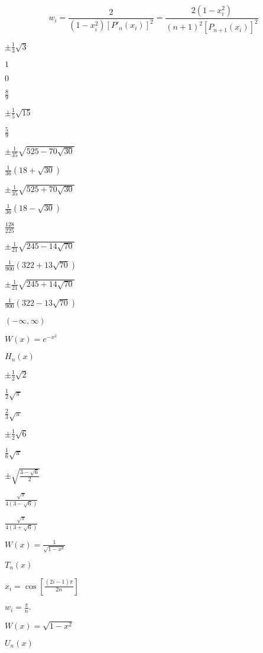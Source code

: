 \documentclass{article}
\begin{document}
\[ w_i = \frac{2}{(1-x_i^2)[P'_n(x_i)]^2}=\frac{2(1-x_i^2)}{(n+1)^2[P_{n+1}(x_i)]^2} \]
\pagebreak

$ \pm \frac{1}{3}\sqrt{3} $
\pagebreak

$ 1 $
\pagebreak

$ 0 $
\pagebreak

$ \frac{8}{9} $
\pagebreak

$ \pm \frac{1}{5} \sqrt{15} $
\pagebreak

$ \frac{5}{9} $
\pagebreak

$ \pm \frac{1}{35}\sqrt{525-70\sqrt{30}} $
\pagebreak

$ \frac{1}{36}(18+\sqrt{30})$
\pagebreak

$ \pm \frac{1}{35}\sqrt{525+70\sqrt{30}} $
\pagebreak

$ \frac{1}{36}(18-\sqrt{30})$
\pagebreak

$ \frac{128}{225}$
\pagebreak

$ \pm \frac{1}{21}\sqrt{245-14\sqrt{70}} $
\pagebreak

$ \frac{1}{900}(322+13\sqrt{70})$
\pagebreak

$ \pm \frac{1}{21}\sqrt{245+14\sqrt{70}} $
\pagebreak

$ \frac{1}{900}(322-13\sqrt{70})$
\pagebreak

$(-\infty,\infty)$
\pagebreak

$ W(x)=e^{-x^2}$
\pagebreak

$ H_n(x)$
\pagebreak

$\pm \frac{1}{2}\sqrt{2} $
\pagebreak

$ \frac{1}{2}\sqrt{\pi} $
\pagebreak

$ \frac{2}{3}\sqrt{\pi} $
\pagebreak

$\pm \frac{1}{2}\sqrt{6} $
\pagebreak

$ \frac{1}{6}\sqrt{\pi} $
\pagebreak

$\pm \sqrt{\frac{3-\sqrt{6}}{2}} $
\pagebreak

$ \frac{\sqrt{\pi}}{4(3-\sqrt{6})} $
\pagebreak

$ \frac{\sqrt{\pi}}{4(3+\sqrt{6})} $
\pagebreak

$ W(x)=\frac{1}{\sqrt{1-x^2}}$
\pagebreak

$ T_n(x) $
\pagebreak

$ x_i=\cos[\frac{(2i-1)\pi}{2n}]$
\pagebreak

$ w_i=\frac{\pi}{n}. $
\pagebreak

$ W(x)=\sqrt{1-x^2}$
\pagebreak

$ U_n(x) $
\pagebreak
\end{document}
